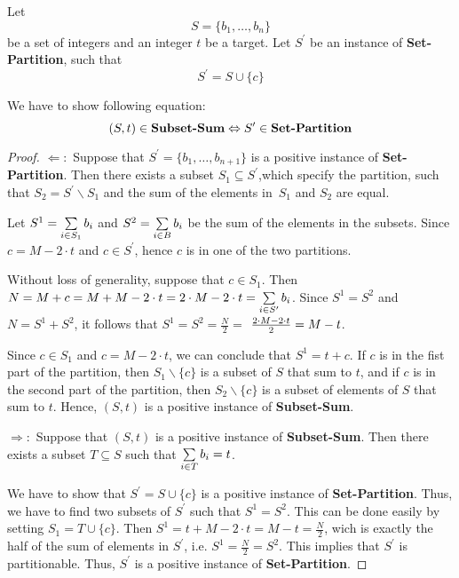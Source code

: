 Let $$S=\{b_{1},\ldots ,b_{n}\}$$ be a set of integers and an integer $t$ be a target.
Let $S^{\prime }$ be an instance of 
\textbf{Set-Partition}, 
such that $$S^{\prime }=S\cup \{c\}$$ 

We have to show following equation:%
\begin{equation*}
(S,t)\in 
\mbox{\textbf{Subset-Sum}}%
\Leftrightarrow S^{\prime }\in 
\mbox{\textbf{Set-Partition}}%
\end{equation*}

\begin{proof}
\hfill\newline
$\Leftarrow :$ Suppose that $S^{\prime }=\{b_{1},\ldots ,b_{n+1}\}$ is a
positive instance of \textbf{Set-Partition}. Then there exists a subset $%
S_1\subseteq S^{\prime }$,which specify the partition, such that $S_2=S^{\prime
}\backslash S_1$ and the sum of the elements in\ $S_1$ and $S_2$ are equal.

Let $S^1=\mathop{\textstyle \sum }\limits_{i\in S_1}b_{i}$ and $S^2=\mathop{\textstyle \sum }\limits_{i\in B}b_{i}$
be the sum of the elements in the subsets. Since $c=M-2\cdot t$ and $c\in
S^{\prime }$, hence $c$ is in one of the two partitions.

Without loss of generality, suppose that $c\in S_1$. Then $N=M+c=M+M-2\cdot
t=2\cdot M-2\cdot t=\mathop{\textstyle \sum }\limits_{i\in S^{\prime }}b_{i}$. Since $S^1=S^2
$ and $N=S^1+S^2$, it follows that $S^1=S^2=\frac{N}{2}=$ $\frac{%
2\cdot M-2\cdot t}{2}=M-t$.

Since $c\in S_1$ and $c=M-2\cdot t$, we can conclude that $S^1=t+c$. If $c$
is in the fist part of the partition, then $S_1\backslash \{c\}$ is a subset
of $S$ that sum to $t$, and if $c$ is in the second part of the partition,
then $S_2\backslash \{c\}$ is a subset of elements of $S$ that sum to $t$.
Hence, $(S,t)$ is a positive instance of \textbf{Subset-Sum}.

$\Rightarrow :$ Suppose that $(S,t)$ is a positive instance of \textbf{%
Subset-Sum}. Then there exists a subset $T\subseteq S$ such that $%
\tsum\limits_{i\in T}b_{i}=t$.

We have to show that $S^{\prime }=S\cup \{c\}$ is a positive instance of 
\textbf{Set-Partition}. Thus, we have to find two subsets of $S^{\prime }$
such that $S^1=S^2$. This can be done easily by setting $S_1=T\cup \{c\}$.
Then $S^1=t+M-2\cdot t=M-t=\frac{N}{2}$, wich is exactly the half of the
sum of elements in $S^{\prime }$, i.e. $S^1=\frac{N}{2}=S^2$. This
implies that $S^{\prime }$ is partitionable. Thus, $S^{\prime }$ is a
positive instance of \textbf{Set-Partition}.
\end{proof}

